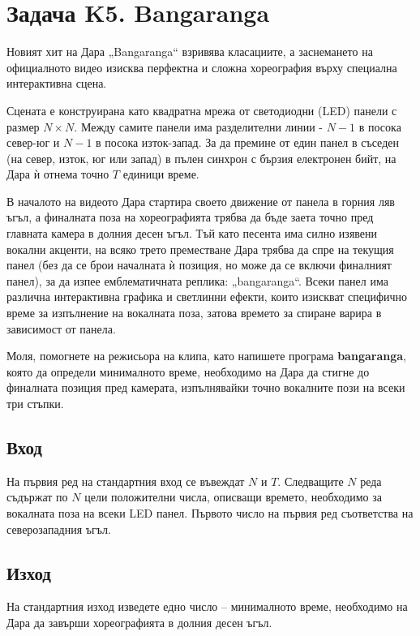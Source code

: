 \documentclass[12pt]{article}
\begin{document}
	
	\section{Задача K5. Bangaranga}
    
    Новият хит на Дара „Bangaranga“ взривява класациите, а заснемането на официалното видео изисква перфектна и сложна хореография върху специална интерактивна сцена.

    Сцената е конструирана като квадратна мрежа от светодиодни (LED) панели с размер $N \times N$. Между самите панели има разделителни линии - $N-1$ в посока север-юг и $N-1$ в посока изток-запад. За да премине от един панел в съседен (на север, изток, юг или запад) в пълен синхрон с бързия електронен бийт, на Дара ѝ отнема точно $T$ единици време.
    
    В началото на видеото Дара стартира своето движение от панела в горния ляв ъгъл, а финалната поза на хореографията трябва да бъде заета точно пред главната камера в долния десен ъгъл. Тъй като песента има силно изявени вокални акценти, на всяко трето преместване Дара трябва да спре на текущия панел (без да се брои началната ѝ позиция, но може да се включи финалният панел), за да изпее емблематичната реплика: „bangaranga“. Всеки панел има различна интерактивна графика и светлинни ефекти, които изискват специфично време за изпълнение на вокалната поза, затова времето за спиране варира в зависимост от панела.
    
    Моля, помогнете на режисьора на клипа, като напишете програма \textbf{bangaranga}, която да определи минималното време, необходимо на Дара да стигне до финалната позиция пред камерата, изпълнявайки точно вокалните пози на всеки три стъпки.
    
    \subsection*{Вход}
    На първия ред на стандартния вход се въвеждат $N$ и $T$. 
    Следващите $N$ реда съдържат по $N$ цели положителни числа, описващи времето, необходимо за вокалната поза на всеки LED панел. Първото число на първия ред съответства на северозападния ъгъл.
    
    \subsection*{Изход}
    На стандартния изход изведете едно число – минималното време, необходимо на Дара да завърши хореографията в долния десен ъгъл.
    
\end{document}
